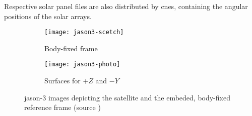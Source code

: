 Respective solar panel files are also distributed by \gls{cnes}, containing the 
angular positions of the solar arrays.

\begin{figure}
  \centering
  \begin{subfigure}[b]{0.45\textwidth}
    \centering
    \texttt{[image: jason3-scetch]}
    \caption{Body-fixed frame}
    \label{fig:jason3-scetch}
  \end{subfigure}
  \begin{subfigure}[b]{0.45\textwidth}
    \centering
    \texttt{[image: jason3-photo]}
    \caption{Surfaces for $+Z$ and $-Y$}
    \label{fig:jason3-photo}
  \end{subfigure}
  \caption{\gls{jason}-3 images depicting the satellite and the embeded, 
    body-fixed reference frame (source \cite{Couderc2015})}
  \label{fig:jason3-view}
\end{figure}
